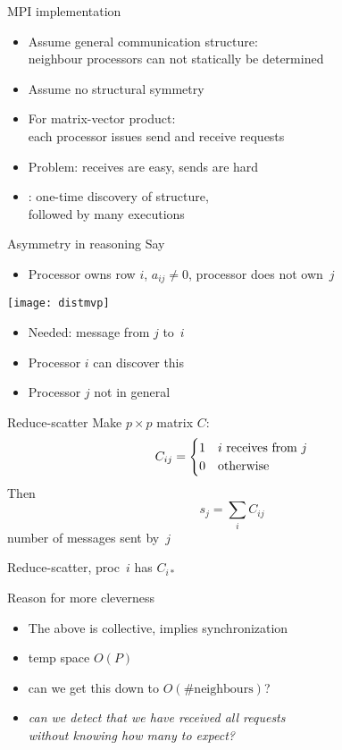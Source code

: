 \begin{frame}{MPI implementation}
\begin{itemize}
\item Assume general communication structure:\\
  neighbour processors can not statically be determined
\item Assume no structural symmetry
\item For matrix-vector product:\\
  each processor issues send and receive requests
\item Problem: receives are easy, sends are hard
\item {}: one-time discovery of structure,\\
  followed by many executions
\end{itemize}
\end{frame}

\begin{frame}{Asymmetry in reasoning}
Say
\begin{itemize}
\item Processor owns row $i$, $a_{ij}\not=0$, processor does not own~$j$
\end{itemize}
  \texttt{[image: distmvp]}\\
  \begin{itemize}
  \item Needed: message from $j$ to~$i$
  \item Processor $i$ can discover this
  \item Processor $j$ not in general
  \end{itemize}
\end{frame}

\begin{frame}{Reduce-scatter}
Make $p\times p$ matrix $C$:
\[ C_{ij}=
\begin{cases}
  1&\hbox{$i$ receives from $j$}\\ 0&\hbox{otherwise}
\end{cases}
\]
Then \[ s_j = \sum_i C_{ij} \]
number of messages sent by~$j$

Reduce-scatter, proc~$i$ has $C_{i*}$
\end{frame}

\begin{frame}{Reason for more cleverness}
  \begin{itemize}
  \item The above is collective, implies synchronization
  \item temp space $O(P)$
  \item can we get this down to $O(\#\mathrm{neighbours})$?
  \item \textsl{can we detect that we have received all requests\\
    without knowing how many to expect?}
  \end{itemize}
\end{frame}

